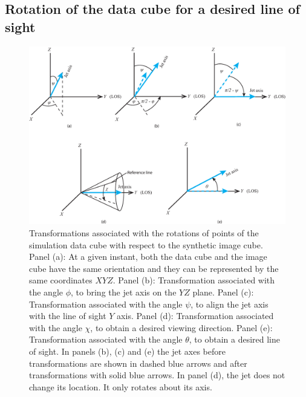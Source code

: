 %
%
\newpage
\begin{appendices}
\section{Rotation of the data cube for a desired line of sight}\label{A:trans}
\begin{figure}
\centering
\includegraphics[width=\textwidth]{fig9.eps}
\caption{Transformations associated with the rotations of points of the simulation data cube with respect to the synthetic image cube. Panel (a): At a given instant, both the data cube and the image cube have the same orientation and they can be represented by the same coordinates $XYZ$. Panel (b): Transformation associated with the angle $\phi$, to bring the jet axis on the $YZ$ plane. Panel (c): Transformation associated with the angle $\psi$, to align the jet axis with the line of sight $Y$ axis. Panel (d): Transformation associated with the angle $\chi$, to obtain a desired viewing direction. Panel (e): Transformation associated with the angle $\theta$, to obtain a desired line of sight. In panels (b), (c) and (e) the jet axes before transformations are shown in dashed blue arrows and after transformations with solid blue arrows. In panel (d), the jet does not change its location. It only rotates about its axis. }

\end{figure}
\end{appendices}
